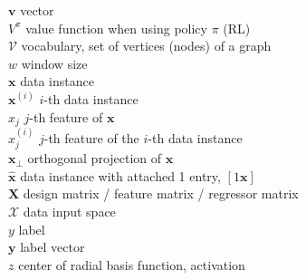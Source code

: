 \documentclass[12pt]{article}
\begin{document}
\begin{tabbing}
	\> $\bm{v}$									\>	vector											\\[3mm]
	\> $V^{\pi}$									\>	value function when using policy $\pi$ (RL)					\\[3mm]
	\> $\mathcal{V}$								\>	vocabulary, set of vertices (nodes) of a graph					\\[3mm]
	\> $w$										\>	window size										\\[3mm]
	\> $\bm{x}$									\> 	data instance										\\[3mm]
	\> $\bm{x}^{(i)}$								\>	$i$-th data instance									\\[3mm]
	\> $x_j$										\>	$j$-th feature of $\bm{x}$								\\[3mm]
	\> $x_j^{(i)}$									\>	$j$-th feature of the $i$-th data instance					\\[3mm]
	\> $\bm{x}_{\perp}$								\>	orthogonal projection of $\bm{x}$							\\[3mm]
	\> $\widehat{\bm{x}}$							\>	data instance with attached 1 entry, $[1 \bm{x}]$				\\[3mm]
	\> $\bm{X}$									\>	design matrix / feature matrix / regressor matrix				\\[3mm]
	\> $\mathcal{X}$								\> 	data input space										\\[3mm]
	\> $y$										\>	label												\\[3mm]
	\> $\bm{y}$									\>	label vector											\\[3mm]
	\> $z$										\>	center of radial basis function, activation						\\[10mm]
	

\end{tabbing}
\end{document}
